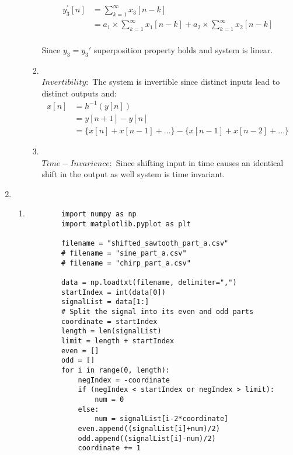 \documentclass[10pt,a4paper, margin=1in]{article}
\begin{document}
\begin{enumerate}
\begin{enumerate}
\begin{enumerate}
\begin{align*}
                    \\y_3^{'}[n] &= \sum_{k=1}^{\infty} x_3[n - k]
                    \\&= a_1\times \sum_{k=1}^{\infty} x_1[n - k] + a_2 \times \sum_{k=1}^{\infty} x_2[n -k]
                \end{align*}
                \\Since $y_3 = y_3'$ superposition property holds and system is linear.
                \\
            \item 
            \\$Invertibility:$ The system is invertible since distinct inputs lead to distinct outputs and:
            \begin{align*}
                x[n] &= h^{-1}(y[n]) 
                \\&= y[n + 1] - y[n] 
                \\&= \{x[n] + x[n-1] + ...\} - \{x[n-1] + x[n-2] + ...\} 
            \end{align*}
            \item 
            \\$Time-Invarience: $
            Since shifting input in time causes an identical shift in the output as well system is time invariant.
            \\
        \end{enumerate}
    \end{enumerate}
    
\newpage
\item %
    \begin{enumerate}
    \item %
    \begin{verbatim}  
        import numpy as np
        import matplotlib.pyplot as plt
        
        filename = "shifted_sawtooth_part_a.csv"
        # filename = "sine_part_a.csv"
        # filename = "chirp_part_a.csv"
        
        data = np.loadtxt(filename, delimiter=",")
        startIndex = int(data[0])
        signalList = data[1:]
        # Split the signal into its even and odd parts
        coordinate = startIndex
        length = len(signalList)
        limit = length + startIndex
        even = []
        odd = []
        for i in range(0, length):
            negIndex = -coordinate
            if (negIndex < startIndex or negIndex > limit):
                num = 0
            else:
                num = signalList[i-2*coordinate]
            even.append((signalList[i]+num)/2)
            odd.append((signalList[i]-num)/2)
            coordinate += 1
        

\end{verbatim}
\end{enumerate}
\end{enumerate}
\end{document}
